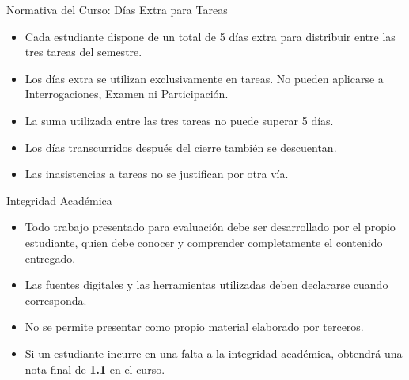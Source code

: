 \documentclass{beamer}
\begin{document}
    \begin{frame}{Normativa del Curso: Días Extra para Tareas}
        
        \begin{itemize}
            \item Cada estudiante dispone de un total de 5 días extra para distribuir
            entre las tres tareas del semestre.
            \item Los días extra se utilizan exclusivamente en tareas. No pueden aplicarse a 
            Interrogaciones, Examen ni Participación.
            \item La suma utilizada entre las tres tareas no puede superar 5 días.
            \item Los días transcurridos después del cierre también se descuentan.
            \item Las inasistencias a tareas no se justifican por otra vía.
        \end{itemize}
        
    \end{frame}

    \begin{frame}[label=integridad-academica]{Integridad Académica}
        
        \begin{itemize}
            \item Todo trabajo presentado para evaluación debe ser desarrollado por
            el propio estudiante, quien debe conocer y comprender completamente
            el contenido entregado.
            \item Las fuentes digitales y las herramientas utilizadas deben declararse
            cuando corresponda.
            \item No se permite presentar como propio material elaborado por terceros.
            \item Si un estudiante incurre en una falta a la integridad académica, 
            obtendrá una nota final de \textbf{1.1} en el curso.
        \end{itemize}
        
    \end{frame}
\end{document}
